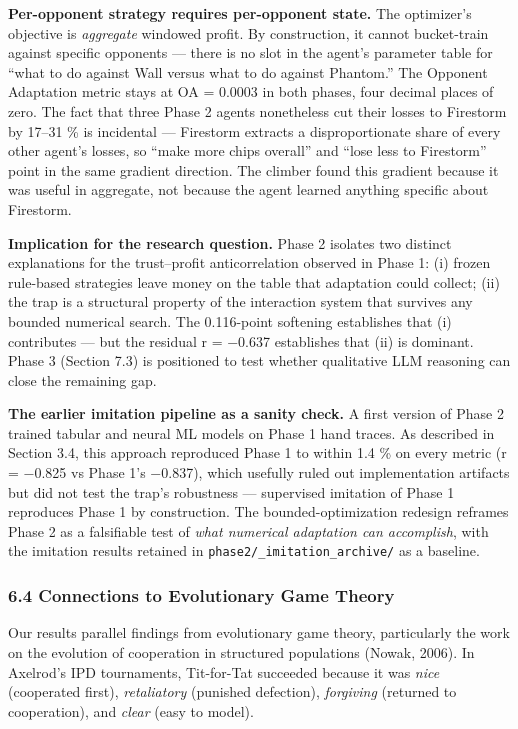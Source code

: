 \documentclass[
]{article}
\begin{document}
\textbf{Per-opponent strategy requires per-opponent state.} The
optimizer's objective is \emph{aggregate} windowed profit. By
construction, it cannot bucket-train against specific opponents ---
there is no slot in the agent's parameter table for ``what to do against
Wall versus what to do against Phantom.'' The Opponent Adaptation metric
stays at OA = 0.0003 in both phases, four decimal places of zero. The
fact that three Phase 2 agents nonetheless cut their losses to Firestorm
by 17--31 \% is incidental --- Firestorm extracts a disproportionate
share of every other agent's losses, so ``make more chips overall'' and
``lose less to Firestorm'' point in the same gradient direction. The
climber found this gradient because it was useful in aggregate, not
because the agent learned anything specific about Firestorm.

\textbf{Implication for the research question.} Phase 2 isolates two
distinct explanations for the trust--profit anticorrelation observed in
Phase 1: (i) frozen rule-based strategies leave money on the table that
adaptation could collect; (ii) the trap is a structural property of the
interaction system that survives any bounded numerical search. The
0.116-point softening establishes that (i) contributes --- but the
residual r = −0.637 establishes that (ii) is dominant. Phase 3 (Section
7.3) is positioned to test whether qualitative LLM reasoning can close
the remaining gap.

\textbf{The earlier imitation pipeline as a sanity check.} A first
version of Phase 2 trained tabular and neural ML models on Phase 1 hand
traces. As described in Section 3.4, this approach reproduced Phase 1 to
within 1.4 \% on every metric (r = −0.825 vs Phase 1's −0.837), which
usefully ruled out implementation artifacts but did not test the trap's
robustness --- supervised imitation of Phase 1 reproduces Phase 1 by
construction. The bounded-optimization redesign reframes Phase 2 as a
falsifiable test of \emph{what numerical adaptation can accomplish},
with the imitation results retained in
\texttt{phase2/\_imitation\_archive/} as a baseline.

\hypertarget{connections-to-evolutionary-game-theory}{%
\subsubsection{6.4 Connections to Evolutionary Game
Theory}\label{connections-to-evolutionary-game-theory}}

Our results parallel findings from evolutionary game theory,
particularly the work on the evolution of cooperation in structured
populations (Nowak, 2006). In Axelrod's IPD tournaments, Tit-for-Tat
succeeded because it was \emph{nice} (cooperated first),
\emph{retaliatory} (punished defection), \emph{forgiving} (returned to
cooperation), and \emph{clear} (easy to model).
\end{document}
